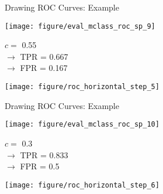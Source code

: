 \documentclass[11pt,compress,t,notes=noshow, xcolor=table]{beamer}
\begin{document}

\begin{vbframe}{Drawing ROC Curves: Example}
	
	\begin{knitrout}\scriptsize
		\color{fgcolor}
		
		{
			\texttt{[image: figure/eval\_mclass\_roc\_sp\_9]}
		}
		
	\end{knitrout}
	
	\vfill
	
	\begin{minipage}[b]{0.3\textwidth}
		$c =$ 0.55\\ 
		$\rightarrow$ TPR = 0.667 \\
		$\rightarrow$ FPR = 0.167
	\end{minipage}%
	\begin{minipage}[b]{0.7\textwidth}
		\texttt{[image: figure/roc\_horizontal\_step\_5]} 
	\end{minipage}
	
\end{vbframe}


\begin{vbframe}{Drawing ROC Curves: Example}
	
	\begin{knitrout}\scriptsize
		\color{fgcolor}
		
		{
			\texttt{[image: figure/eval\_mclass\_roc\_sp\_10]} 
		}
		
	\end{knitrout}
	
	\vfill
	
	\begin{minipage}[b]{0.3\textwidth}
		$c =$ 0.3\\ 
		$\rightarrow$ TPR = 0.833 \\
		$\rightarrow$ FPR = 0.5
	\end{minipage}%
	\begin{minipage}[b]{0.7\textwidth}
		\texttt{[image: figure/roc\_horizontal\_step\_6]} 
	\end{minipage}
	
\end{vbframe}
\end{document}
